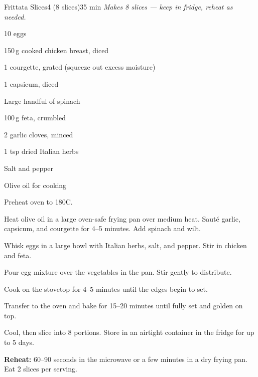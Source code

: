 \begin{recipebox}{Frittata Slices}{4 (8 slices)}{35 min}
\textit{Makes 8 slices --- keep in fridge, reheat as needed.}

\begin{ingredients}
  \item 10 eggs
  \item 150\,g cooked chicken breast, diced
  \item 1 courgette, grated (squeeze out excess moisture)
  \item 1 capsicum, diced
  \item Large handful of spinach
  \item 100\,g feta, crumbled
  \item 2 garlic cloves, minced
  \item 1 tsp dried Italian herbs
  \item Salt and pepper
  \item Olive oil for cooking
\end{ingredients}

\begin{method}
  \item Preheat oven to 180\textdegree C.
  \item Heat olive oil in a large oven-safe frying pan over medium heat. Saut\'{e} garlic, capsicum, and courgette for 4--5 minutes. Add spinach and wilt.
  \item Whisk eggs in a large bowl with Italian herbs, salt, and pepper. Stir in chicken and feta.
  \item Pour egg mixture over the vegetables in the pan. Stir gently to distribute.
  \item Cook on the stovetop for 4--5 minutes until the edges begin to set.
  \item Transfer to the oven and bake for 15--20 minutes until fully set and golden on top.
  \item Cool, then slice into 8 portions. Store in an airtight container in the fridge for up to 5 days.
\end{method}

\begin{notelist}
  \item \textbf{Reheat:} 60--90 seconds in the microwave or a few minutes in a dry frying pan. Eat 2 slices per serving.
\end{notelist}
\end{recipebox}
